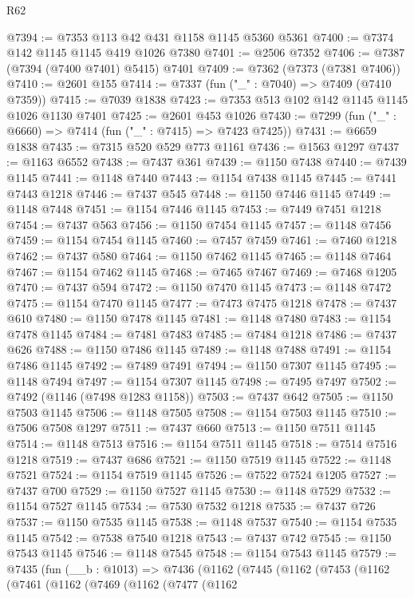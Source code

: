 \begin{lexlean}{R62}
\begin{coremodule}
@7394 := @7353 @113 @42 @431 @1158 @1145 @5360 @5361
@7400 := @7374 @142 @1145 @1145 @419 @1026 @7380
@7401 := @2506 @7352
@7406 := @7387 (@7394 (@7400 @7401) @5415) @7401
@7409 := @7362 (@7373 (@7381 @7406))
@7410 := @2601 @155
@7414 := @7337 (fun ("_" : @7040) => @7409 (@7410 @7359))
@7415 := @7039 @1838
@7423 := @7353 @513 @102 @142 @1145 @1145 @1026 @1130 @7401
@7425 := @2601 @453 @1026
@7430 := @7299 (fun ("_" : @6660) => @7414 (fun ("_" : @7415) => @7423 @7425))
@7431 := @6659 @1838
@7435 := @7315 @520 @529 @773 @1161
@7436 := @1563 @1297
@7437 := @1163 @6552
@7438 := @7437 @361
@7439 := @1150 @7438
@7440 := @7439 @1145
@7441 := @1148 @7440
@7443 := @1154 @7438 @1145
@7445 := @7441 @7443 @1218
@7446 := @7437 @545
@7448 := @1150 @7446 @1145
@7449 := @1148 @7448
@7451 := @1154 @7446 @1145
@7453 := @7449 @7451 @1218
@7454 := @7437 @563
@7456 := @1150 @7454 @1145
@7457 := @1148 @7456
@7459 := @1154 @7454 @1145
@7460 := @7457 @7459
@7461 := @7460 @1218
@7462 := @7437 @580
@7464 := @1150 @7462 @1145
@7465 := @1148 @7464
@7467 := @1154 @7462 @1145
@7468 := @7465 @7467
@7469 := @7468 @1205
@7470 := @7437 @594
@7472 := @1150 @7470 @1145
@7473 := @1148 @7472
@7475 := @1154 @7470 @1145
@7477 := @7473 @7475 @1218
@7478 := @7437 @610
@7480 := @1150 @7478 @1145
@7481 := @1148 @7480
@7483 := @1154 @7478 @1145
@7484 := @7481 @7483
@7485 := @7484 @1218
@7486 := @7437 @626
@7488 := @1150 @7486 @1145
@7489 := @1148 @7488
@7491 := @1154 @7486 @1145
@7492 := @7489 @7491
@7494 := @1150 @7307 @1145
@7495 := @1148 @7494
@7497 := @1154 @7307 @1145
@7498 := @7495 @7497
@7502 := @7492 (@1146 (@7498 @1283 @1158))
@7503 := @7437 @642
@7505 := @1150 @7503 @1145
@7506 := @1148 @7505
@7508 := @1154 @7503 @1145
@7510 := @7506 @7508 @1297
@7511 := @7437 @660
@7513 := @1150 @7511 @1145
@7514 := @1148 @7513
@7516 := @1154 @7511 @1145
@7518 := @7514 @7516 @1218
@7519 := @7437 @686
@7521 := @1150 @7519 @1145
@7522 := @1148 @7521
@7524 := @1154 @7519 @1145
@7526 := @7522 @7524 @1205
@7527 := @7437 @700
@7529 := @1150 @7527 @1145
@7530 := @1148 @7529
@7532 := @1154 @7527 @1145
@7534 := @7530 @7532 @1218
@7535 := @7437 @726
@7537 := @1150 @7535 @1145
@7538 := @1148 @7537
@7540 := @1154 @7535 @1145
@7542 := @7538 @7540 @1218
@7543 := @7437 @742
@7545 := @1150 @7543 @1145
@7546 := @1148 @7545
@7548 := @1154 @7543 @1145
@7579 := @7435
    (fun (__b : @1013) =>
    @7436
      (@1162
        (@7445
          (@1162
            (@7453
              (@1162
                (@7461
                  (@1162
                    (@7469
                      (@1162
                        (@7477
                          (@1162

\end{coremodule}
\end{lexlean}
